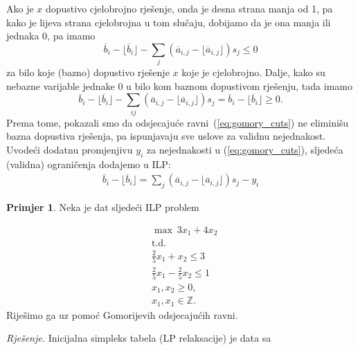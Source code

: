 \documentclass[a4paper, utf8, 11pt, colorlinks]{book}
\theoremstyle{definition}
\newtheorem{primjer}{Primjer}[chapter]
\begin{document}
Ako je $x$ dopustivo cjelobrojno rješenje, onda je desna strana manja od 1, pa kako je lijeva strana cjelobrojna u tom slučaju, dobijamo da je ona manja ili jednaka 0, pa imamo
\begin{equation}\label{eq:gomory_cuts}
    \overline{b}_i - \lfloor \overline{b}_i  \rfloor    - \sum_{j} (\overline{a}_{i,j} - \lfloor \overline{a}_{i,j} \rfloor) s_j \leq 0
\end{equation}
za bilo koje (bazno) dopustivo rješenje $x$ koje je cjelobrojno. Dalje, kako su nebazne varijable jednake 0 u bilo kom baznom dopustivom rješenju, tada imamo 
$$ \overline{b}_i - \lfloor \overline{b}_i  \rfloor    - \sum_{ij} (\overline{a}_{i,j} - \lfloor \overline{a}_{i,j} \rfloor) s_j = \overline{b}_i - \lfloor \overline{b}_i \rfloor  \geq 0.$$
Prema tome, pokazali smo da odsjecajuće ravni~(\ref{eq:gomory_cuts}) ne eliminišu bazna dopustiva rješenja, pa ispunjavaju sve uslove za validnu nejednakost. Uvodeći dodatnu promjenjivu $y_i$ za nejednakosti u (\ref{eq:gomory_cuts}), sljedeća (validna) ograničenja dodajemo u ILP:
\begin{align}\label{gomory_cplex}
       \overline{b}_i - \lfloor \overline{b}_i \rfloor=   \sum_{j} (\overline{a}_{i,j} - \lfloor \overline{a}_{i,j} \rfloor)s_j - y_i 
\end{align}

\begin{primjer} Neka je dat sljedeći ILP problem
	\end{primjer}
\begin{align*}
    &\max\ 3 x_1 + 4 x_2 \\
    & \mbox{t.d. }  \\
    & \displaystyle\frac{2}{5}x_1 + x_2 \leq 3 \\
    & \displaystyle\frac{2}{5}x_1 - \frac{2}{5}x_2 \leq 1 \\
    &x_1, x_2 \geq 0, \\
    &  x_1, x_1 \in \mathbb{Z}.
\end{align*}
Riješimo ga uz pomoć Gomorijevih odsjecajućih ravni. 

\emph{Rješenje.}
Inicijalna simpleks tabela (LP relaksacije) je data sa 
\end{document}
